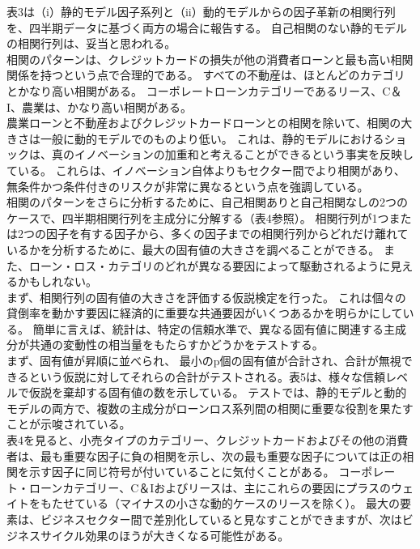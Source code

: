 \documentclass[a4j,12pt]{jarticle}
\begin{document}
表3は（i）静的モデル因子系列と（ii）動的モデルからの因子革新の相関行列を、四半期データに基づく両方の場合に報告する。 自己相関のない静的モデルの相関行列は、妥当と思われる。\\
相関のパターンは、クレジットカードの損失が他の消費者ローンと最も高い相関関係を持つという点で合理的である。 すべての不動産は、ほとんどのカテゴリとかなり高い相関がある。 コーポレートローンカテゴリーであるリース、C＆I、農業は、かなり高い相関がある。\\
農業ローンと不動産およびクレジットカードローンとの相関を除いて、相関の大きさは一般に動的モデルでのものより低い。 これは、静的モデルにおけるショックは、真のイノベーションの加重和と考えることができるという事実を反映している。 これらは、イノベーション自体よりもセクター間でより相関があり、無条件かつ条件付きのリスクが非常に異なるという点を強調している。\\
相関のパターンをさらに分析するために、自己相関ありと自己相関なしの2つのケースで、四半期相関行列を主成分に分解する（表4参照）。 相関行列が1つまたは2つの因子を有する因子から、多くの因子までの相関行列からどれだけ離れているかを分析するために、最大の固有値の大きさを調べることができる。 また、ローン・ロス・カテゴリのどれが異なる要因によって駆動されるように見えるかもしれない。\\
まず、相関行列の固有値の大きさを評価する仮説検定を行った。 これは個々の貸倒率を動かす要因に経済的に重要な共通要因がいくつあるかを明らかにしている。 簡単に言えば、統計は、特定の信頼水準で、異なる固有値に関連する主成分が共通の変動性の相当量をもたらすかどうかをテストする。\\
まず、固有値が昇順に並べられ、 最小のp個の固有値が合計され、合計が無視できるという仮説に対してそれらの合計がテストされる。表5は、様々な信頼レベルで仮説を棄却する固有値の数を示している。 テストでは、静的モデルと動的モデルの両方で、複数の主成分がローンロス系列間の相関に重要な役割を果たすことが示唆されている。\\
表4を見ると、小売タイプのカテゴリー、クレジットカードおよびその他の消費者は、最も重要な因子に負の相関を示し、次の最も重要な因子については正の相関を示す因子に同じ符号が付いていることに気付くことがある。 コーポレート・ローンカテゴリー、C＆Iおよびリースは、主にこれらの要因にプラスのウェイトをもたせている（マイナスの小さな動的ケースのリースを除く）。 最大の要素は、ビジネスセクター間で差別化していると見なすことができますが、次はビジネスサイクル効果のほうが大きくなる可能性がある。
\end{document}
